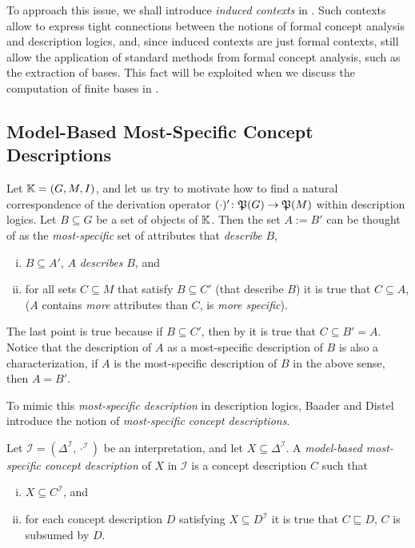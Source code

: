 To approach this issue, we shall introduce \emph{induced contexts} in
.  Such contexts allow to express tight connections between the
notions of formal concept analysis and description logics, and, since induced contexts are
just formal contexts, still allow the application of standard methods from formal concept
analysis, such as the extraction of bases.  This fact will be exploited when we discuss
the computation of finite bases in .

\subsection{Model-Based Most-Specific Concept Descriptions}
\label{sec:defin-and-basic}

Let ${\mathbb{K}} = (G, M, I)$, and let us try to motivate how to find a natural correspondence
of the derivation operator $(\cdot)' \colon {\ensuremath{\mathfrak{P}(G)}} \to {\ensuremath{\mathfrak{P}(M)}}$ within
description logics.  Let $B \subseteq G$ be a set of objects of ${\mathbb{K}}$.  Then the set $A
:= B'$ can be thought of as the \emph{most-specific} set of attributes that
\emph{describe} $B$, \ie
\begin{enumerate}[i. ]
\item $B \subseteq A'$, \ie $A$ \emph{describes} $B$, and
\item for all sets $C \subseteq M$ that satisfy $B \subseteq C'$ (that describe $B$) it is
  true that $C \subseteq A$, ($A$ contains \emph{more} attributes than $C$, \ie is
  \emph{more specific}).
\end{enumerate}
The last point is true because if $B \subseteq C'$, then by
 it is true that $C \subseteq B' = A$.  Notice
that the description of $A$ as a most-specific description of $B$ is also a
characterization, \ie if $A$ is the most-specific description of $B$ in the above sense,
then $A = B'$.

To mimic this \emph{most-specific description} in description logics, Baader and Distel
introduce the notion of \emph{most-specific concept descriptions}.

\begin{Definition}
  \label{def:most-specific-concept-description}
  Let $\mathcal{I} = (\Delta^{\mathcal{I}}, \cdot^{\mathcal{I}})$ be an interpretation,
  and let $X \subseteq \Delta^{\mathcal{I}}$.  A \emph{model-based most-specific concept
    description} of $X$ in $\mathcal{I}$ is a concept description $C$ such that
  \begin{enumerate}[i. ]
  \item $X \subseteq C^{\mathcal{I}}$, and
  \item for each concept description $D$ satisfying $X \subseteq D^{\mathcal{I}}$ it is
    true that $C \sqsubseteq D$, \ie $C$ is subsumed by $D$.
  \end{enumerate}
\end{Definition}


